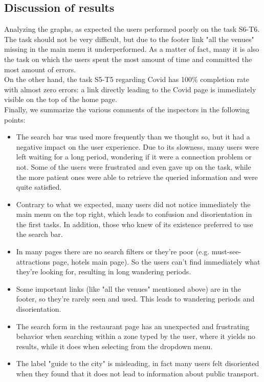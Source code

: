 \subsection{Discussion of results}
    Analyzing the graphs, as expected the users performed poorly on the task S6-T6. The task should not be very difficult, but due to the footer link "all the venues" missing in the main menu it underperformed. As a matter of fact, many it is also the task on which the users spent the most amount of time and committed the most amount of errors.\\
    On the other hand, the task S5-T5 regarding Covid has 100\% completion rate with almost zero errors: a link directly leading to the Covid page is immediately visible on the top of the home page.\\
    Finally, we summarize the various comments of the inspectors in the following points:
    \begin{itemize}
        \item The search bar was used more frequently than we thought so, but it had a negative impact on the user experience. Due to its slowness, many users were left waiting for a long period, wondering if it were a connection problem or not. Some of the users were frustrated and even gave up on the task, while the more patient ones were able to retrieve the queried information and were quite satisfied.
        \item Contrary to what we expected, many users did not notice immediately the main menu on the top right, which leads to confusion and disorientation in the first tasks. In addition, those who knew of its existence preferred to use the search bar.
        \item In many pages there are no search filters or they're poor (e.g. must-see-attractions page, hotels main page). So the users can't find immediately what they're looking for, resulting in long wandering periods.
        \item Some important links (like "all the venues" mentioned above) are in the footer, so they're rarely seen and used. This leads to wandering periods and disorientation.
        \item The search form in the restaurant page has an unexpected and frustrating behavior when searching within a zone typed by the user, where it yields no results, while it does when selecting from the dropdown menu.
        \item The label "guide to the city" is misleading, in fact many users felt disoriented when they found that it does not lead to information about public transport.
    \end{itemize}